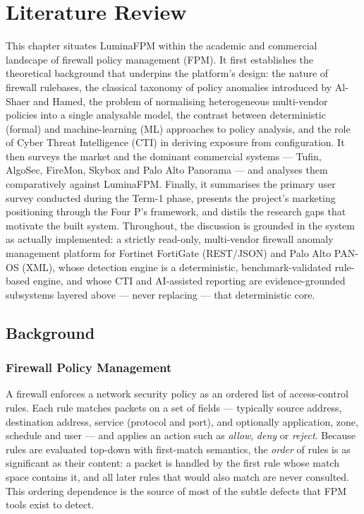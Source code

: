 \documentclass[12pt,a4paper]{report}
\renewcommand{\_}{\textunderscore\allowbreak}
\begin{document}
\chapter{Literature Review}
\label{ch2-literature-review}

This chapter situates LuminaFPM within the academic and commercial landscape of firewall policy management (FPM). It first establishes the theoretical background that underpins the platform's design: the nature of firewall rulebases, the classical taxonomy of policy anomalies introduced by Al-Shaer and Hamed, the problem of normalising heterogeneous multi-vendor policies into a single analysable model, the contrast between deterministic (formal) and machine-learning (ML) approaches to policy analysis, and the role of Cyber Threat Intelligence (CTI) in deriving exposure from configuration. It then surveys the market and the dominant commercial systems --- Tufin, AlgoSec, FireMon, Skybox and Palo Alto Panorama --- and analyses them comparatively against LuminaFPM. Finally, it summarises the primary user survey conducted during the Term-1 phase, presents the project's marketing positioning through the Four P's framework, and distils the research gaps that motivate the built system. Throughout, the discussion is grounded in the system as actually implemented: a strictly read-only, multi-vendor firewall anomaly management platform for Fortinet FortiGate (REST/JSON) and Palo Alto PAN-OS (XML), whose detection engine is a deterministic, benchmark-validated rule-based engine, and whose CTI and AI-assisted reporting are evidence-grounded subsystems layered above --- never replacing --- that deterministic core.

\section{Background}
\label{sec:ch2-background}

\subsection{Firewall Policy Management}
A firewall enforces a network security policy as an ordered list of access-control rules. Each rule matches packets on a set of fields --- typically source address, destination address, service (protocol and port), and optionally application, zone, schedule and user --- and applies an action such as \emph{allow}, \emph{deny} or \emph{reject}. Because rules are evaluated top-down with first-match semantics, the \emph{order} of rules is as significant as their content: a packet is handled by the first rule whose match space contains it, and all later rules that would also match are never consulted. This ordering dependence is the source of most of the subtle defects that FPM tools exist to detect.
\end{document}

